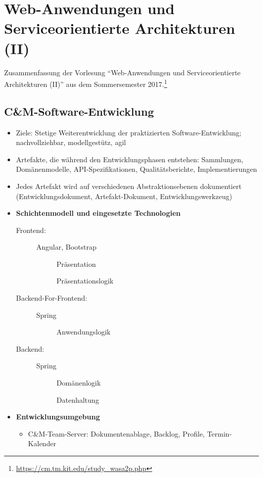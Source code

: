 \chapter{Web-Anwendungen und Serviceorientierte Architekturen (II)}

Zusammenfassung der Vorlesung "`Web-Anwendungen und Serviceorientierte Architekturen (II)"' aus dem Sommersemester 2017.\footnote{\url{https://cm.tm.kit.edu/study_wasa2p.php}}

\section{C\&M-Software-Entwicklung}
\begin{itemize}
	\item Ziele: Stetige Weiterentwicklung der praktizierten Software-Entwicklung; nachvollziehbar, modellgestütz, agil
	\item Artefakte, die während den Entwicklungsphasen entstehen: Sammlungen, Domänenmodelle, API-Spezifikationen, Qualitätsberichte, Implementierungen
	\item Jedes Artefakt wird auf verschiedenen Abstraktionsebenen dokumentiert (Entwicklungsdokument, Artefakt-Dokument, Entwicklungswerkzeug)
	\item \textbf{Schichtenmodell und eingesetzte Technologien}
	\begin{description}
		\item[Frontend:] Angular, Bootstrap
		\begin{description}
			\item[] Präsentation
			\item[] Präsentationslogik
		\end{description}
		\item[Backend-For-Frontend:] Spring
		\begin{description}
			\item[] Anwendungslogik
		\end{description}
		\item[Backend:] Spring
		\begin{description}
			\item[] Domänenlogik
			\item[] Datenhaltung
		\end{description}
	\end{description}
	\item \textbf{Entwicklungsumgebung}
	\begin{itemize}
		\item C\&M-Team-Server: Dokumentenablage, Backlog, Profile, Termin-Kalender

\end{itemize}
\end{itemize}
